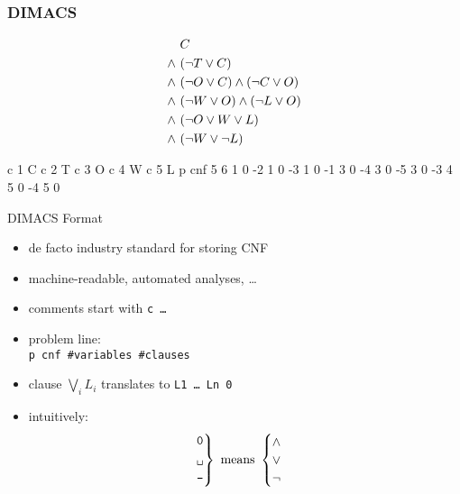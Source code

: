 \subsubsection*{DIMACS}

\begin{frame}[fragile]{\myframetitle}
 	\begin{mycolumns}[columns=3,widths={25,25,50}]
		\vspace*{14ex}
		\begin{align*}
			&~C \\
			\wedge &~(\neg T \vee C) \\
			\wedge &~(\neg O \vee C) \wedge (\neg C \vee O) \\
			\wedge &~(\neg W \vee O) \wedge (\neg L \vee O) \\
			\wedge &~(\neg O \vee W \vee L) \\
			\wedge &~(\neg W \vee \neg L)
		\end{align*}
 	\mynextcolumn
\begin{dimacstight}[basicstyle=\large]{}
c 1 C
c 2 T
c 3 O
c 4 W
c 5 L
p cnf 5 6
1 0
-2 1 0
-3 1 0 -1 3 0
-4 3 0 -5 3 0
-3 4 5 0
-4 5 0
\end{dimacstight}
	\mynextcolumn
		\begin{definition}{DIMACS Format\mysource{\dimacsformat}}
			\begin{itemize}
				\item de facto industry standard for storing CNF
				\item machine-readable, automated analyses, \ldots
				\item comments start with \texttt{c \ldots}
				\item problem line:\\
					\texttt{p cnf \#variables \#clauses}
				\item clause $\bigvee_{i} L_i$ translates to \texttt{L1 \ldots\ Ln 0}
				\item intuitively:
					\begin{equation*}
						\begin{rcases}
							\texttt{0}\\
							\texttt{\textvisiblespace}\\
							\texttt{-}
						\end{rcases} \text{ means } \begin{cases}
							\pand \\
							\por \\
							\pnot
						\end{cases}
					\end{equation*}
			\end{itemize}
		\end{definition}
 	\end{mycolumns}
\end{frame}


